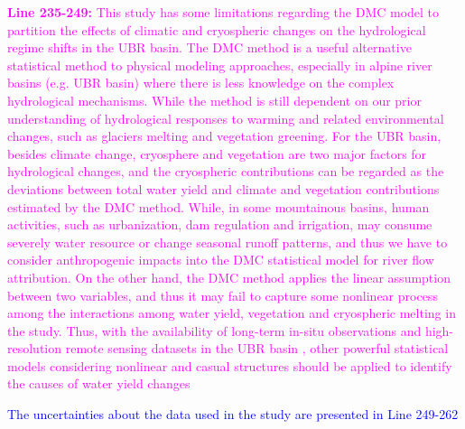\documentclass[11pt]{article}
\newcommand{\nextreply}[1]{\bigskip \textcolor{blue}{\noindent #1}}
\newcommand{\revised}[3][2]{\bigskip \textcolor{magenta}{\noindent \textbf{Line #2:} #3}}
\begin{document}
\revised{235-249}{This study has some limitations regarding the DMC model to partition the effects of climatic and cryospheric changes on the hydrological regime shifts in the UBR basin. 
The DMC method is a useful alternative statistical method to physical modeling approaches, especially in alpine river basins (e.g. UBR basin) where there is less knowledge on the complex hydrological mechanisms.
While the method is still dependent on our prior understanding of hydrological responses to warming and related environmental changes, such as glaciers melting and vegetation greening. 
For the UBR basin, besides climate change, cryosphere \citep{biemans2019importance,yao2019recent} and vegetation \citep{li2021vegetation,li2019greening} are two major factors for hydrological changes, and the cryospheric contributions can be regarded as the deviations between total water yield and climate and vegetation contributions estimated by the DMC method.
While, in some mountainous basins, human activities, such as urbanization, dam regulation and irrigation, may consume severely water resource or change seasonal runoff patterns, and thus we have to consider anthropogenic impacts into the DMC statistical model for river flow attribution. 
On the other hand, the DMC method applies the linear assumption between two variables, and thus it may fail to capture some nonlinear process among the interactions among water yield, vegetation and cryospheric melting in the study. Thus, with the availability of long-term in-situ observations and high-resolution remote sensing datasets in the UBR basin \citep{wang2022observing}, other powerful statistical models considering nonlinear and casual structures should be applied to identify the causes of water yield changes \citep{runge2019inferring}}

\nextreply{The uncertainties about the data used in the study are presented in Line 249-262}
\end{document}
